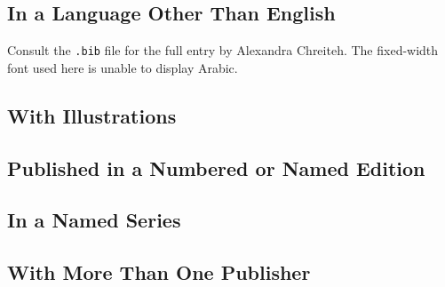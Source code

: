 \documentclass{article}
\begin{document}
\subsection{In a Language Other Than English} %
\label{ssub:in_a_language_other_than_english}
\begin{refsection}
Consult the {\tt .bib} file for the full entry by Alexandra Chreiteh. The fixed-width font used here is unable to display Arabic.
	\printbibliography[heading=none]
\end{refsection}
\subsection{With Illustrations} %
\label{ssub:with_illustrations}
\begin{refsection}
	\printbibliography[heading=none]
\end{refsection}
\subsection{Published in a Numbered or Named Edition} %
\label{ssub:published_in_a_numbered_or_named_edition}
\begin{refsection}
	\printbibliography[heading=none]
\end{refsection}
\subsection{In a Named Series} %
\label{ssub:in_a_named_series}
\begin{refsection}
	\printbibliography[heading=none]
\end{refsection}
\subsection{With More Than One Publisher} %
\label{ssub:with_more_than_one_publisher}
\begin{refsection}
	\printbibliography[heading=none]
\end{refsection}
\end{document}
